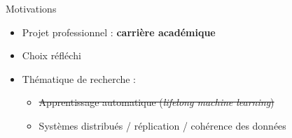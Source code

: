 \documentclass[10pt]{beamer}
\begin{document}

\begin{frame}{Motivations}
  \begin{itemize}
    \item Projet professionnel : \textbf{carrière académique}
    \item Choix réfléchi
    \item Thématique de recherche :
      \begin{itemize}
        \item \st{Apprentissage automatique (\emph{lifelong machine learning})}
        \item Systèmes distribués / réplication / cohérence des données
      \end{itemize}
  \end{itemize}
\end{frame}
\end{document}
